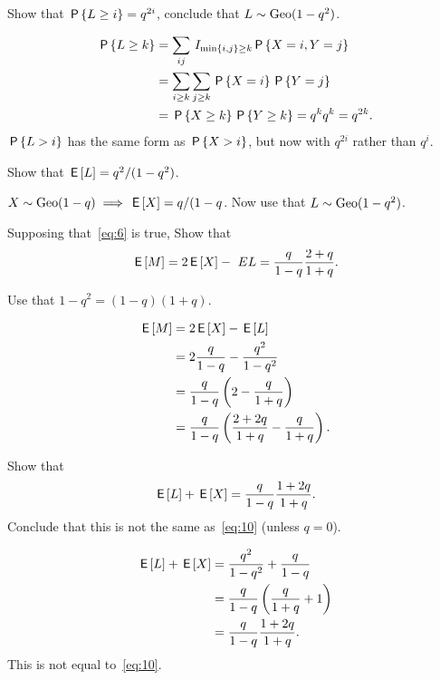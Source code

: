 \documentclass[a4paper,12pt]{article}
\begin{document}
\begin{exercise}
Show that $\P{L\geq i}=q^{2i}$, conclude that $L\sim\Geo{1-q^{2}}$.
\begin{solution}
  \begin{align}
    \label{eq:12}
\P{L\geq k} 
&= \sum_{ij} \1{\min{i,j}\geq k} \P{X=i, Y=j}\\
&= \sum_{i\geq k} \sum_{j\geq k} \P{X=i}\P{Y=j}\\
&=  \P{X\geq k}\P{Y\geq k} = q^{k} q^{k} = q^{2k}.
  \end{align}
$\P{L>i}$ has the same form as $\P{X>i}$, but now with $q^{2i}$ rather than $q^{i}$.
\end{solution}
\end{exercise}


\begin{exercise}\label{ex:3}
Show that  $\E L=q^{2}/(1-q^{2})$.
\begin{solution}
$X\sim \Geo{1-q} \implies \E X = q/(1-q$. Now use that $L\sim\Geo{1-q^{2}}$. 
\end{solution}
\end{exercise}


\begin{exercise}
Supposing that~\cref{eq:6} is true, Show that
\begin{equation}
  \label{eq:10}
\E M = 2\E X  -\ EL = \frac q{1-q} \frac{2+q}{1+q}.
\end{equation}
\begin{hint}
Use that $1-q^2=(1-q)(1+q)$.
\end{hint}
\begin{solution}
  \begin{align}
    \label{eq:11}
\E M 
&= 2\E X - \E L \\
&= 2\frac q{1-q}  - \frac{q^2}{1-q^2}\\
&= \frac q{1-q}\left(2  - \frac{q}{1+q}\right)\\
&= \frac q{1-q}\left(\frac{2+2q}{1+q}  - \frac{q}{1+q}\right).
  \end{align}
\end{solution}
\end{exercise}


\begin{exercise}
Show that 
\begin{equation}
  \label{eq:39}
\E L + \E X = \frac q{1-q}\frac{1+2q}{1+q}.
\end{equation}
Conclude that this is not the same as~\cref{eq:10}  (unless $q=0$).
\begin{solution}
  \begin{align}
    \label{eq:2}
\E L     + \E X 
&= \frac{q^{2}}{1-q^2} + \frac{q}{1-q} \\
&= \frac q{1-q}\left(\frac{q}{1+q} + 1\right)\\
&= \frac q{1-q}\frac{1+2q}{1+q}.
  \end{align}
This is not equal to~\cref{eq:10}.
\end{solution}
\end{exercise}
\end{document}
